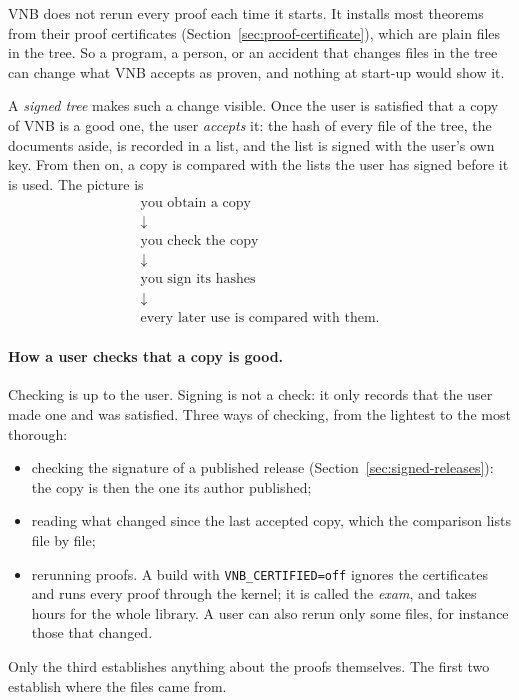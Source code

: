 VNB does not rerun every proof each time it starts.  It installs most
theorems from their proof certificates
(Section~\ref{sec:proof-certificate}), which are plain files in the
tree.  So a program, a person, or an accident that changes files in
the tree can change what VNB accepts as proven, and nothing at
start-up would show it.

A \emph{signed tree} makes such a change visible.  Once the user is
satisfied that a copy of VNB is a good one, the user \emph{accepts}
it: the hash of every file of the tree, the documents aside, is
recorded in a list, and the list is signed with the user's own key.  From then on, a copy is
compared with the lists the user has signed before it is used.  The
picture is
\[
  \begin{array}{c}
  \text{you obtain a copy}\\
  \downarrow\\
  \text{you check the copy}\\
  \downarrow\\
  \text{you sign its hashes}\\
  \downarrow\\
  \text{every later use is compared with them.}
  \end{array}
\]

\paragraph{How a user checks that a copy is good.}  Checking is up to
the user.  Signing is not a check: it only records that the user made
one and was satisfied.  Three ways of checking, from the lightest to
the most thorough:
\begin{itemize}
\item checking the signature of a published release
  (Section~\ref{sec:signed-releases}): the copy is then the one its
  author published;
\item reading what changed since the last accepted copy, which the
  comparison lists file by file;
\item rerunning proofs.  A build with \texttt{VNB\_CERTIFIED=off}
  ignores the certificates and runs every proof through the kernel; it
  is called the \emph{exam}, and takes hours for the whole library.  A
  user can also rerun only some files, for instance those that
  changed.
\end{itemize}
Only the third establishes anything about the proofs themselves.  The
first two establish where the files came from.

